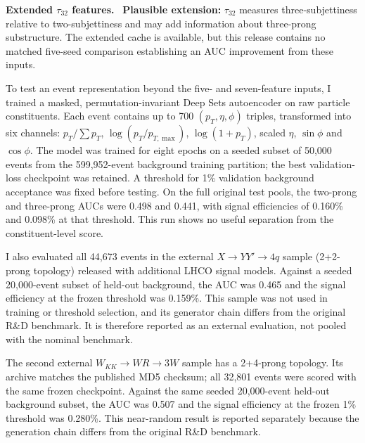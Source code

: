 \documentclass[11pt,a4paper]{article}
\newcommand{\subhead}[1]{\par\vspace{4pt}{\sffamily\bfseries\normalsize #1}\par\nopagebreak\vspace{1pt}}
\newcommand{\runin}[1]{\par\vspace{2pt}\textbf{#1.}\ }
\newcommand{\tauthree}{\tau_{32}}
\begin{document}
\runin{Extended $\tau_{32}$ features}
\textbf{Plausible extension:} $\tauthree$ measures three-subjettiness relative
to two-subjettiness and may add information about three-prong substructure.\cite{Thaler2011}
The extended cache is available, but this release contains no matched
five-seed comparison establishing an AUC improvement from these inputs.

\subhead{Constituent-level representation and external signal}
To test an event representation beyond the five- and seven-feature inputs, I trained a
masked, permutation-invariant Deep Sets autoencoder on raw particle constituents. Each
event contains up to 700 $(p_T,\eta,\phi)$ triples, transformed into six channels:
$p_T/\sum p_T$, $\log(p_T/p_{T,\max})$, $\log(1+p_T)$, scaled $\eta$,
$\sin\phi$ and $\cos\phi$. The model was trained for eight epochs on a seeded subset
of 50,000 events from the 599,952-event background training partition; the best
validation-loss checkpoint was retained. A threshold for 1\% validation background
acceptance was fixed before testing. On the full original test pools, the two-prong and
three-prong AUCs were 0.498 and 0.441, with signal efficiencies of 0.160\% and 0.098\%
at that threshold. This run shows no useful separation from the constituent-level score.

I also evaluated all 44,673 events in the external $X\to YY'\to 4q$ sample
(2+2-prong topology) released with additional LHCO signal models.\cite{AdditionalSignals2026}
Against a seeded 20,000-event subset of held-out background, the AUC was 0.465 and the
signal efficiency at the frozen threshold was 0.159\%. This sample was not used in
training or threshold selection, and its generator chain differs from the original R\&D
benchmark. It is therefore reported as an external evaluation, not pooled with the
nominal benchmark.

The second external $W_{KK}\to WR\to3W$ sample has a 2+4-prong topology.
Its archive matches the published MD5 checksum; all 32,801 events were scored
with the same frozen checkpoint. Against the same seeded 20,000-event held-out
background subset, the AUC was 0.507 and the signal efficiency at the frozen
1\% threshold was 0.280\%. This near-random result is reported separately
because the generation chain differs from the original R\&D benchmark.
\end{document}
